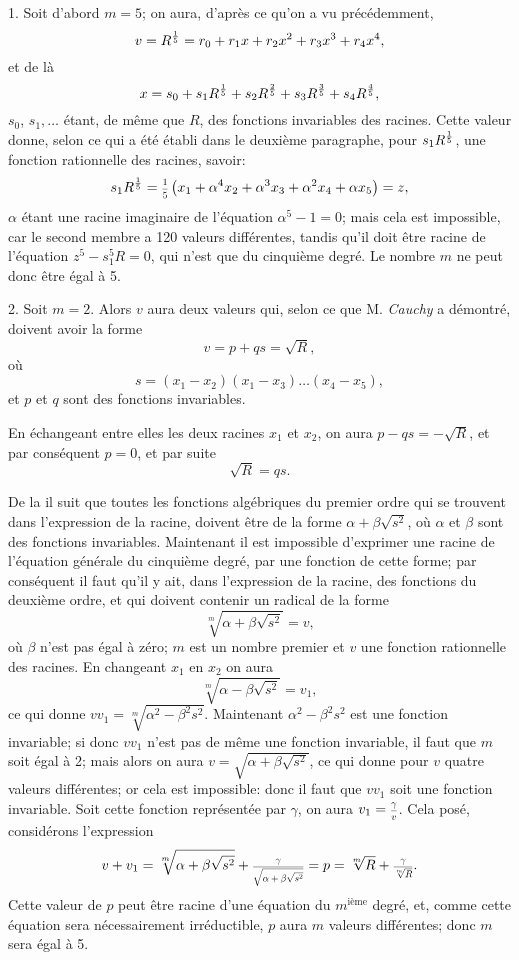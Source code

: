 \documentclass[oneside, 12 pt, leqno]{memoir}
\let\oldfrac\frac
\def\frac#1#2{\mathchoice{\text{\scalebox{.83}{${\oldfrac{#1}{#2}}$}}}{\text{\scalebox{.83}{${\displaystyle\oldfrac{#1}{#2}}$}}}{\genfrac{}{}{}{2}{#1}{#2}}{\genfrac{}{}{}{3}{#1}{#2}}}
\begin{document}
1. Soit d'abord \(m=5\); on aura, d'après ce qu'on a vu précédemment,
\[v={R}^{\frac{1}{5}}=r_0+r_1 x+r_2 x^2+r_3 x^3+r_4 x^4,\]
et de là
\[x=s_0+s_1 R^{\frac{1}{5}}+s_2 R^{\frac{2}{5}}+s_3 R^{\frac{3}{5}}+s_4 R^{\frac{4}{5}},\]
\(s_0\), \(s_1, \dots\) étant, de même que \(R\), des fonctions invariables des racines. Cette valeur donne, selon ce qui a été établi dans le deuxième paragraphe, pour \(s_1 R^{\frac{1}{5}}\), une fonction rationnelle des racines, savoir:
\[s_1 R^{\frac{1}{5}}=\frac{1}{5}\left(x_1+\alpha^4 x_2+\alpha^3 x_3+\alpha^2 x_4+\alpha x_5\right)=z,\]
\(\alpha\) étant une racine imaginaire de l'équation \(\alpha^5-1=0\); mais cela est impossible, car le second membre a 120 valeurs différentes, tandis qu'il doit être racine de l'équation \(z^5-s_1^5 R=0\), qui n'est que du cinquième degré. Le nombre \(m\) ne peut donc être égal à 5.

2. Soit \(m=2\). Alors \(v\) aura deux valeurs qui, selon ce que M. \textit{Cauchy} a démontré, doivent avoir la forme
\[v=p+q s=\sqrt{R},\]
où
\[s=\left(x_1-x_2\right)\left(x_1-x_3\right) \dots\left(x_4-x_5\right),\]
et \(p\) et \(q\) sont des fonctions invariables.

En échangeant entre elles les deux racines \(x_1\) et \(x_2\), on aura \(p-q s=-\sqrt{R}\), et par conséquent \(p=0\), et par suite
\[\sqrt{R}=q s.\]

De la il suit que toutes les fonctions algébriques du premier ordre qui se trouvent dans l'expression de la racine, doivent être de la forme \(\alpha+\beta \sqrt{s^2}\), où \(\alpha\) et \(\beta\) sont des fonctions invariables. Maintenant il est impossible d'exprimer une racine de l'équation générale du cinquième degré, par une fonction de cette forme; par conséquent il faut qu'il y ait, dans l'expression de la racine, des fonctions du deuxième ordre, et qui doivent contenir un radical de la forme
\[\sqrt[m]{\alpha+\beta \sqrt{s^2}}=v,\]
où \(\beta\) n'est pas égal à zéro; \(m\) est un nombre premier et \(v\) une fonction rationnelle des racines. En changeant \(x_1\) en \(x_2\) on aura
\[\sqrt[m]{\alpha-\beta \sqrt{s^2}}=v_1,\]
ce qui donne \(v v_1=\sqrt[m]{\alpha^2-\beta^2 s^2}\). Maintenant \(\alpha^2-\beta^2 s^2\) est une fonction invariable; si donc \(v v_1\) n'est pas de même une fonction invariable, il faut que \(m\) soit égal à 2; mais alors on aura \(v=\sqrt{\alpha+\beta \sqrt{s^2}}\), ce qui donne pour \(v\) quatre valeurs différentes; or cela est impossible: donc il faut que \(v v_1\) soit une fonction invariable. Soit cette fonction représentée par \(\gamma\), on aura \(v_1=\frac{\gamma}{v}\). Cela posé, considérons l'expression
\[v+v_1=\sqrt[m]{\alpha+\beta \sqrt{s^2}}+\frac{\gamma}{\sqrt{\alpha+\beta \sqrt{s^2}}}=p=\sqrt[m]{R}+\frac{\gamma}{\sqrt[m]{R}}.\]
Cette valeur de \(p\) peut être racine d'une équation du \(m^{\text{ième}}\) degré, et, comme cette équation sera nécessairement irréductible, \(p\) aura \(m\) valeurs différentes; donc \(m\) sera égal à 5.
\end{document}
